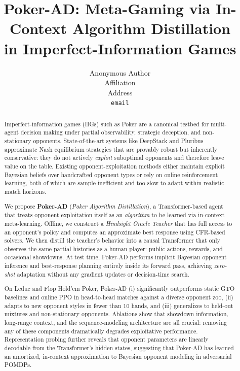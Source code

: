 \documentclass{article}
\title{Poker-AD: Meta-Gaming via In-Context Algorithm Distillation\\
in Imperfect-Information Games}
\author{%
  Anonymous Author \\
  Affiliation \\
  Address \\
  \texttt{email} \\
}
\date{}
\begin{document}
\maketitle

\begin{abstract}
Imperfect-information games (IIGs) such as Poker are a canonical testbed for multi-agent decision making under partial observability, strategic deception, and non-stationary opponents. State-of-the-art systems like DeepStack and Pluribus approximate Nash equilibrium strategies that are provably robust but inherently conservative: they do not actively \emph{exploit} suboptimal opponents and therefore leave value on the table. Existing opponent-exploitation methods either maintain explicit Bayesian beliefs over handcrafted opponent types or rely on online reinforcement learning, both of which are sample-inefficient and too slow to adapt within realistic match horizons.

We propose \textbf{Poker-AD} (\emph{Poker Algorithm Distillation}), a Transformer-based agent that treats opponent exploitation itself as an \emph{algorithm} to be learned via in-context meta-learning. Offline, we construct a \emph{Hindsight Oracle Teacher} that has full access to an opponent's policy and computes an approximate best response using CFR-based solvers. We then distill the teacher's behavior into a causal Transformer that only observes the same partial histories as a human player: public actions, rewards, and occasional showdowns. At test time, Poker-AD performs implicit Bayesian opponent inference and best-response planning entirely inside its forward pass, achieving \emph{zero-shot} adaptation without any gradient updates or decision-time search.

On Leduc and Flop Hold'em Poker, Poker-AD (i) significantly outperforms static GTO baselines and online PPO in head-to-head matches against a diverse opponent zoo, (ii) adapts to new opponent styles in fewer than 10 hands, and (iii) generalizes to held-out mixtures and non-stationary opponents. Ablations show that showdown information, long-range context, and the sequence-modeling architecture are all crucial: removing any of these components dramatically degrades exploitative performance. Representation probing further reveals that opponent parameters are linearly decodable from the Transformer's hidden states, suggesting that Poker-AD has learned an amortized, in-context approximation to Bayesian opponent modeling in adversarial POMDPs.
\end{abstract}
\end{document}
